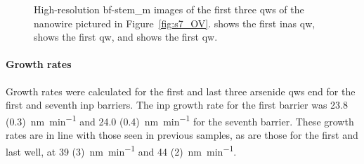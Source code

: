 \begin{figure}
    \centering
    \caption[High-resolution \acs{bf}-\acs{stem_m} images of the first three \acl{qw}s of the nanowire cross-section from sample 7.]{High-resolution \acs{bf}-\acs{stem_m} images of the first three \acl{qw}s of the nanowire pictured in Figure~\ref{fig:s7_OV}.  shows the first \acs{inas} \acl{qw},  shows the first  \acl{qw}, and  shows the first  \acl{qw}.}
    \label{fig:s7_well1-3_HR}
\end{figure}

\paragraph{Growth rates} Growth rates were calculated for the first and last three arsenide \acl{qw}s end for the first and seventh \acs{inp} barriers. The \acs{inp} growth rate for the first barrier was \qty[separate-uncertainty=true]{23.8 (0.3)}{\nano\metre\per\minute} and \qty[separate-uncertainty=true]{24.0 (0.4)}{\nano\metre\per\minute} for the seventh barrier. These growth rates are in line with those seen in previous samples, as are those for the first and last  well, at \qty[separate-uncertainty=true]{39 (3)}{\nano\metre\per\minute} and \qty[separate-uncertainty=true]{44 (2)}{\nano\metre\per\minute}.

